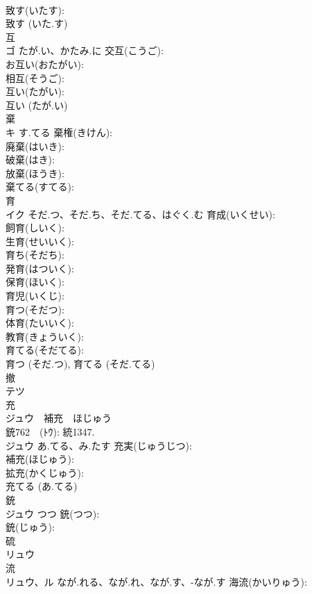 \documentclass[8pt]{extreport}
\begin{document}
\begin{CJK}{UTF8}{min}
\\	致す(いたす): 
\\	致す (いた.す)
\\	互			
\\	ゴ	たが.い、かたみ.に	交互(こうご): 
\\	お互い(おたがい): 
\\	相互(そうご): 
\\	互い(たがい): 
\\	互い (たが.い)
\\	棄			
\\	キ	す.てる	棄権(きけん): 
\\	廃棄(はいき): 
\\	破棄(はき): 
\\	放棄(ほうき): 
\\	棄てる(すてる): 
\\	育			
\\	イク	そだ.つ、そだ.ち、そだ.てる、はぐく.む	育成(いくせい): 
\\	飼育(しいく): 
\\	生育(せいいく): 
\\	育ち(そだち): 
\\	発育(はついく): 
\\	保育(ほいく): 
\\	育児(いくじ): 
\\	育つ(そだつ): 
\\	体育(たいいく): 
\\	教育(きょういく): 
\\	育てる(そだてる): 
\\	育つ (そだ.つ), 育てる (そだ.てる)
\\	撤			
\\	テツ			
\\	充			
\\	ジュウ　補充　ほじゅう
\\	銃762　(ﾄｳ): 統1347.	
\\	ジュウ	あ.てる、み.たす	充実(じゅうじつ): 
\\	補充(ほじゅう): 
\\	拡充(かくじゅう): 
\\	充てる (あ.てる)
\\	銃			
\\	ジュウ	つつ	銃(つつ): 
\\	銃(じゅう): 
\\	硫			
\\	リュウ			
\\	流			
\\	リュウ、ル	なが.れる、なが.れ、なが.す、-なが.す	海流(かいりゅう): 

\end{CJK}
\end{document}
